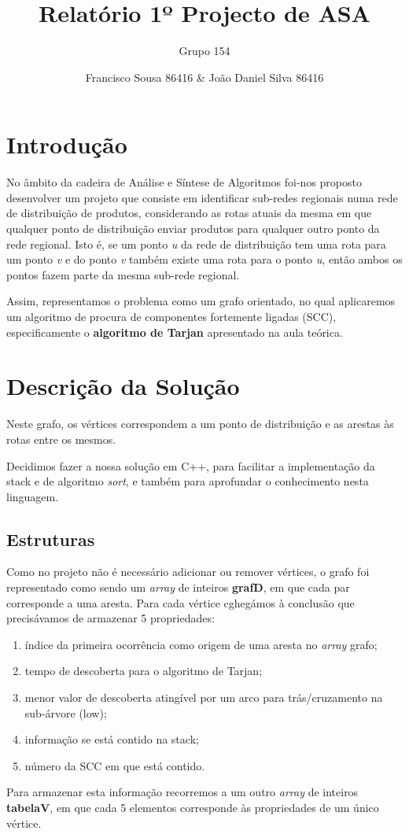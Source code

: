 \documentclass[12pt,a4paper]{article}
\author{Grupo 154 \and Francisco Sousa 86416 \& João Daniel Silva 86416}
\title{Relatório 1º Projecto de ASA}
\begin{document}
\maketitle

\section{Introdução}
No âmbito da cadeira de Análise e Síntese de Algoritmos foi-nos proposto desenvolver um projeto que consiste em identificar sub-redes regionais numa rede de distribuição
de produtos, considerando as rotas atuais da mesma em que qualquer ponto de distribuição enviar produtos para qualquer outro ponto da rede regional. Isto é, se um ponto \textit{u}
da rede de distribuição tem uma rota para um ponto \textit{v} e do ponto \textit{v} também existe uma rota para o ponto \textit{u}, então ambos os pontos fazem parte da mesma sub-rede regional.

Assim, representamos o problema como um grafo orientado, no qual aplicaremos um algoritmo de procura de componentes fortemente ligadas (SCC), especificamente o \textbf{algoritmo de Tarjan} apresentado na aula teórica.
\section{Descrição da Solução}
Neste grafo, os vértices correspondem a um ponto de distribuição e as arestas às rotas entre os mesmos.

Decidimos fazer a nossa solução em C++, para facilitar a implementação da stack e de algoritmo \textit{sort}, e também para aprofundar o conhecimento nesta linguagem.

\subsection{Estruturas}
Como no projeto não é necessário adicionar ou remover vértices, o grafo foi representado como sendo um \textit{array} de inteiros \textbf{grafD}, em que cada par corresponde a uma aresta.
Para cada vértice cghegámos à conclusão que precisávamos de armazenar 5 propriedades:
\begin{enumerate}
	\item índice da primeira ocorrência como origem de uma aresta no \textit{array} grafo;
	\item tempo de descoberta para o algoritmo de Tarjan;
	\item menor valor de descoberta atingível por um arco para trás/cruzamento na sub-árvore (low);
	\item informação se está contido na stack;
	\item número da SCC em que está contido.
\end{enumerate}
Para armazenar esta informação recorremos a um outro \textit{array} de inteiros \textbf{tabelaV}, em que cada 5 elementos corresponde às propriedades de um único vértice.
\end{document}
